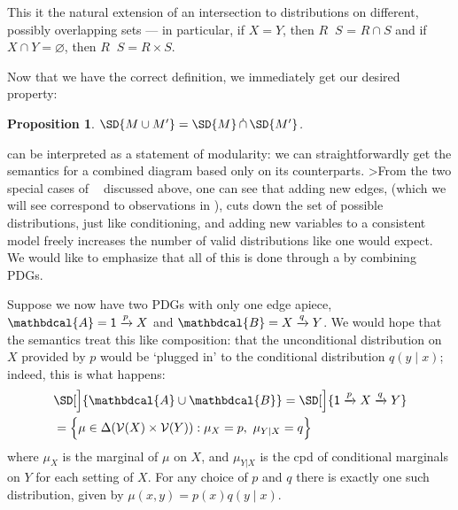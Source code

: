 \documentclass{article}
\theoremstyle{plain}
\newtheorem{prop}[theorem]{Proposition}
\theoremstyle{definition}
\theoremstyle{remark}
\newcommand{\notation}[2][]{#1}
\renewcommand{\notation}[2][]{{\color{notationcolor} #2}}
\DeclareMathOperator\dcap{\mathop{\dot\cap}}
\newcommand{\V}{\mathcal V}
\newcommand{\dg}[1]{\mathbdcal{#1}}
\newcommand{\var}[1]{\mathsf{#1}}
\numberwithin{equation}{section}
\begin{document}
\begin{vfull}
\begin{defn}[$\dcap$]
	This it the natural extension of an intersection to distributions on different, possibly overlapping sets --- in particular, if $X = Y$, then $R \dcap S$ = $R \cap S$ and if \notation[$X$ and $Y$ are disjoint]{$X \cap Y = \varnothing$}, then $R \dcap S = R \times S$. 
\end{defn}


Now that we have the correct definition, we immediately get our desired property:

\begin{prop}\label{prop:union-set-semantics}
	$\SD{M \cup M'} = \SD{M} \dcap \SD{M'}$.
\end{prop}

 can be interpreted as a statement of modularity: we can straightforwardly get the semantics for a combined diagram based only on its counterparts. 
>From the two special cases of $\dcap$ discussed above, one can see that adding new edges, (which we will see correspond to observations in ), cuts down the set of possible distributions, just like conditioning, and adding new variables to a consistent model freely increases the number of valid distributions like one would expect. We would like to emphasize that all of this is done through a by combining PDGs.

\begin{example}\label{ex:sd-compose-unconditional}
	Suppose we now have two PDGs with only one edge apiece, $\dg A = {\var 1} \xrightarrow{p} X$ and $\dg B = X \xrightarrow{q} Y$. We would hope that the semantics treat this like composition: that the unconditional distribution on $X$ provided by $p$ would be `plugged in' to the conditional distribution $q(y \mid x)$; indeed, this is what happens:
	\begin{align*}
		&\SD[\Big]{{\dg A \cup \dg B}} = \SD[\Big]{{\var 1} \xrightarrow{p} X \xrightarrow{q} Y} \\
			&= \Big\{  \mu \in \Delta(\V(X) \times \V(Y)) : \mu_X = p,~\mu_{Y|X} = q \Big\} 
	\end{align*}
	where $\mu_X$ is the marginal of $\mu$ on $X$, and $\mu_{Y|X}$ is the cpd of conditional marginals on $Y$ for each setting of $X$.
	For any choice of $p$ and $q$ there is exactly one such distribution, given by $\mu(x,y) = p(x) q(y \mid x)$.
\end{example}



\end{vfull}
\end{document}
